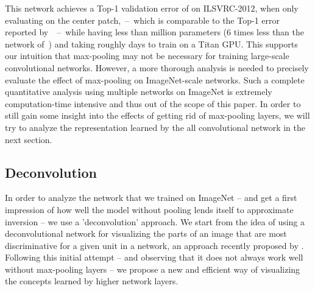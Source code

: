 \documentclass{article} \usepackage{iclr2015,times}
\begin{document}
This network achieves a Top-1 validation error of  on ILSVRC-2012, when only evaluating on the center  patch,~--~which is comparable to the  Top-1 error reported by~\citet{Krizhevsky_NIPS2012}~--~while having less than  million parameters (6 times less than the network of~\citet{Krizhevsky_NIPS2012}) and taking roughly  days to train on a Titan GPU. This supports our intuition that max-pooling may not be necessary for training large-scale convolutional networks. However, a more thorough analysis is needed to precisely evaluate the effect of max-pooling on ImageNet-scale networks. Such a complete quantitative analysis using multiple networks on ImageNet is extremely computation-time intensive and thus out of the scope of this paper. In order to still gain some insight into the effects of getting rid of max-pooling layers, we will try to analyze the representation learned by the all convolutional network in the next section.

\subsection{Deconvolution}
In order to analyze the network that we trained on ImageNet -- and get a first impression of how well the model without pooling lends itself to approximate inversion -- we use a 'deconvolution' approach. We start from the idea of using a deconvolutional network for visualizing the parts of an image that are most discriminative for a given unit in a network, an approach recently proposed by \citet{Zeiler_ECCV2014}. Following this initial attempt -- and observing that it does not always work well without max-pooling layers -- we propose a new and efficient way of visualizing the concepts learned by higher network layers. 
\end{document}
